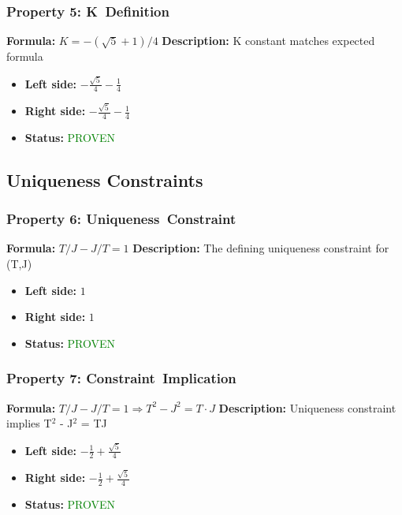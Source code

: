 \subsubsection*{Property 5: K~Definition}
\textbf{Formula:} $K = -(\sqrt{5}+1)/4$
\textbf{Description:} K constant matches expected formula

\begin{itemize}
\item \textbf{Left side:} $- \frac{\sqrt{5}}{4} - \frac{1}{4}$
\item \textbf{Right side:} $- \frac{\sqrt{5}}{4} - \frac{1}{4}$
\item \textbf{Status:} \textcolor{green}{PROVEN}
\end{itemize}


\subsection{Uniqueness Constraints}

\subsubsection*{Property 6: Uniqueness~Constraint}
\textbf{Formula:} $T/J - J/T = 1$
\textbf{Description:} The defining uniqueness constraint for (T,J)

\begin{itemize}
\item \textbf{Left side:} $1$
\item \textbf{Right side:} $1$
\item \textbf{Status:} \textcolor{green}{PROVEN}
\end{itemize}

\subsubsection*{Property 7: Constraint~Implication}
\textbf{Formula:} $T/J - J/T = 1  \Rightarrow  T^2 - J^2 = T \cdot J$
\textbf{Description:} Uniqueness constraint implies T$^2$ - J$^2$ = TJ

\begin{itemize}
\item \textbf{Left side:} $- \frac{1}{2} + \frac{\sqrt{5}}{4}$
\item \textbf{Right side:} $- \frac{1}{2} + \frac{\sqrt{5}}{4}$
\item \textbf{Status:} \textcolor{green}{PROVEN}
\end{itemize}

